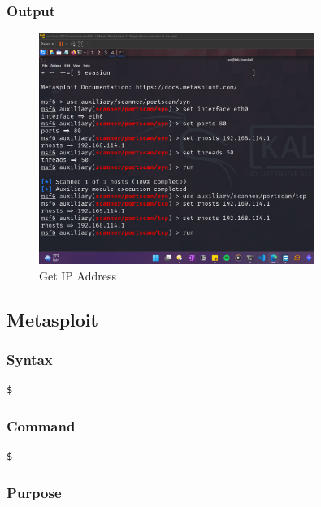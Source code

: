 \documentclass[11pt]{article}
\begin{document}
\subsubsection*{Output}
\begin{figure}[H]
    \centering
    \includegraphics[width=0.8\textwidth]{metasploit tcp (2).png}
    \caption{Get IP Address}
    \label{fig:1}
\end{figure}
\subsection{Metasploit}

\subsubsection*{Syntax}
\begin{verbatim}
$
\end{verbatim}

\subsubsection*{Command}
\begin{verbatim}
$
\end{verbatim}

\subsubsection*{Purpose}
\end{document}

